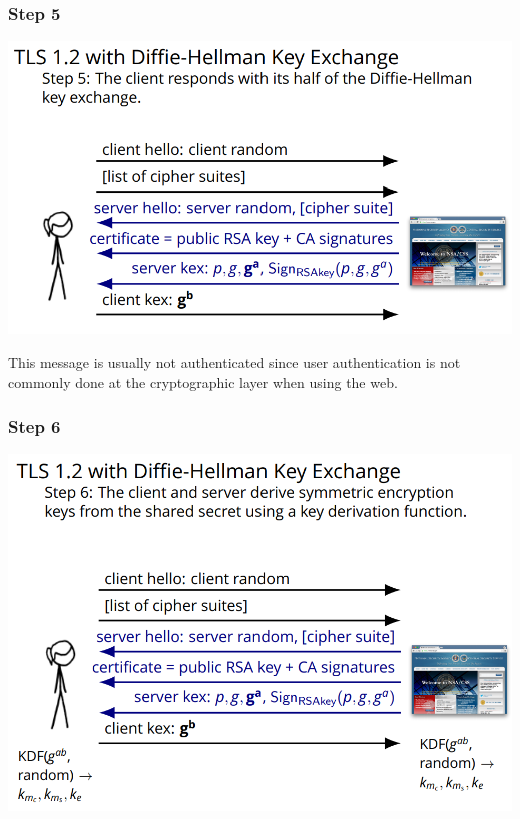\documentclass[11pt]{article} %
\begin{document}
\subsubsection{Step 5}

\begin{center}
	\includegraphics[scale=.8]{./DiffieStep5.png}
\end{center}

\noindent This message is usually not authenticated since user authentication is not 
commonly done at the cryptographic layer when using the web.

\subsubsection{Step 6}

\begin{center}
	\includegraphics[scale=.8]{./DiffieStep6.png}
\end{center}
\end{document}
